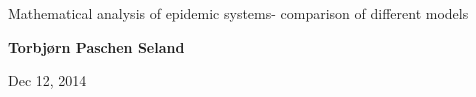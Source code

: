 \documentclass[%
twoside,                 %
final,                   %
chapterprefix=true,      %
open=right               %
10pt]{book}
\begin{document}






\thispagestyle{empty}

\begin{center}
{\LARGE\bf
\begin{spacing}{1.25}
Mathematical analysis of epidemic systems- comparison of different models
\end{spacing}
}
\end{center}


\begin{center}
{\bf Torbjørn Paschen Seland${}^{}$} \\ [0mm]
\end{center}

    \begin{center}
\end{center}


\begin{center}
Dec 12, 2014
\end{center}

\vspace{1cm}


\tableofcontents


\vspace{1cm} %
\end{document}
